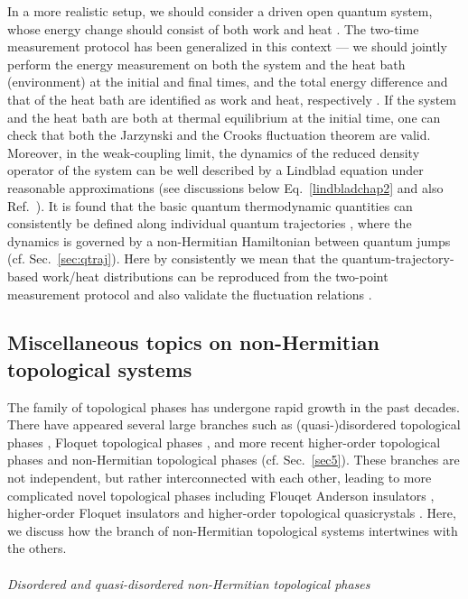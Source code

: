 \documentclass{tADP2e}
\theoremstyle{plain}
\theoremstyle{plain}
\theoremstyle{definition}
\begin{document}
In a more realistic setup, we should consider a driven open quantum system, whose energy change should consist of both work and heat \cite{KR13}. 
The two-time measurement protocol has been generalized in this context --- we should jointly perform the energy measurement on both the system and the heat bath (environment) at the initial and final times, and the total energy difference and that of the heat bath are identified as work and heat, respectively \cite{CM09}. If the system and the heat bath are both at thermal equilibrium at the initial time, one can check that both the Jarzynski and the Crooks fluctuation theorem are valid. Moreover, in the weak-coupling limit, the dynamics of the reduced density operator of the system can be well described by a Lindblad equation under reasonable approximations (see discussions below Eq.~\eqref{lindbladchap2} and also Ref.~\cite{TA12}). It is found that the basic quantum thermodynamic quantities can consistently be defined along individual quantum trajectories \cite{HJM12,HFWJ13,GZ16,MG18}, where the dynamics is governed by a non-Hermitian Hamiltonian between quantum jumps (cf. Sec.~\ref{sec:qtraj}). Here by consistently we mean that the quantum-trajectory-based work/heat distributions can be reproduced from the two-point measurement protocol and also validate the fluctuation relations \cite{SM14,LF16}.  

\subsection{Miscellaneous topics on non-Hermitian topological systems\label{sec:6top}}
The family of topological phases has undergone rapid growth in the past decades. There have appeared several large branches such as (quasi-)disordered topological phases \cite{YEK16}, Floquet topological phases \cite{HF20}, and more recent higher-order topological phases \cite{REG19} and non-Hermitian topological phases (cf. Sec.~\ref{sec5}). These branches are not independent, but rather interconnected with each other, leading to more complicated novel topological phases including Flouqet Anderson insulators \cite{TP16}, higher-order Floquet insulators \cite{HH20} and higher-order topological quasicrystals \cite{CR20}. Here, we discuss how the branch of non-Hermitian topological systems intertwines with the others.
\\ \\ {\it Disordered and quasi-disordered non-Hermitian topological phases}
\end{document}
